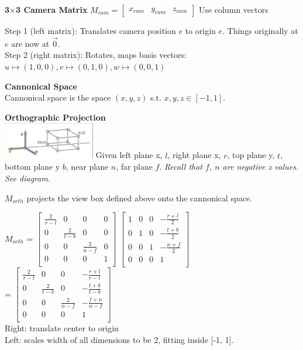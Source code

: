 \documentclass[letterpaper, 8pt]{extarticle}
\begin{document}
\begin{multicols*}{4}
\textbf{3\(\times\)3 Camera Matrix}
\(
M_{cam}
= \begin{bmatrix}
    x_{cam} & y_{cam} & z_{cam}
\end{bmatrix}
\)
Use column vectors

Step 1 (left matrix): Translates camera position $e$ to origin $e$. Things originally at $e$ are now at $\vec{0}$.\\
Step 2 (right matrix): Rotates, maps basis vectors: $u \mapsto (1,0,0), v \mapsto (0,1,0), w \mapsto (0,0,1)$

\textbf{Cannonical Space}\\
Cannonical space is the space $(x, y, z)$ s.t. $x,y,z \in [-1, 1]$.

\textbf{Orthographic Projection}\\

\includegraphics[width=4cm]{cam-ortho.png}
Given left plane x, $l$, right plane x, $r$, top plane y, $t$, bottom plane y $b$, near plane $n$, far plane $f$.
\textit{Recall that $f$, $n$ are negative z values. See diagram.}

$M_{orth}$ projects the view box defined above onto the cannonical space.


$M_{orth}$ = \(
\begin{bmatrix}
    \frac{2}{r-l} & 0             & 0             & 0 \\
    0             & \frac{2}{t-b} & 0             & 0 \\
    0             & 0             & \frac{2}{n-f} & 0 \\
    0             & 0             & 0             & 1 \\
\end{bmatrix}
\)
\(
\begin{bmatrix}
    1 & 0 & 0 & -\frac{r+l}{2} \\
    0 & 1 & 0 & -\frac{t+b}{2} \\
    0 & 0 & 1 & -\frac{n+f}{2} \\
    0 & 0 & 0 & 1              \\
\end{bmatrix}
\)\\
=
\(
\begin{bmatrix}
    \frac{2}{r-l} & 0             & 0             & -\frac{r+l}{r-l} \\
    0             & \frac{2}{t-b} & 0             & -\frac{t+b}{t-b} \\
    0             & 0             & \frac{2}{n-f} & -\frac{f+n}{n-f} \\
    0             & 0             & 0             & 1                \\
\end{bmatrix}
\)\\
Right: translate center to origin\\
Left: scales width of all dimensions to be 2, fitting inside [-1, 1].


\end{multicols*}
\end{document}
